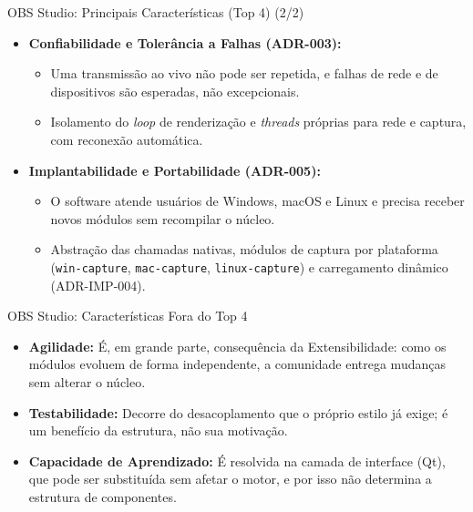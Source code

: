 \documentclass[aspectratio=169]{beamer}
\begin{document}
\begin{frame}{OBS Studio: Principais Características (Top 4) (2/2)}
\begin{itemize}\setlength{\itemsep}{0.8em}
\item \textbf{Confiabilidade e Tolerância a Falhas (ADR-003):}
  \begin{itemize}
  \item Uma transmissão ao vivo não pode ser repetida, e falhas de rede e de dispositivos são esperadas, não excepcionais.
  \item Isolamento do \textit{loop} de renderização e \textit{threads} próprias para rede e captura, com reconexão automática.
  \end{itemize}
\item \textbf{Implantabilidade e Portabilidade (ADR-005):}
  \begin{itemize}
  \item O software atende usuários de Windows, macOS e Linux e precisa receber novos módulos sem recompilar o núcleo.
  \item Abstração das chamadas nativas, módulos de captura por plataforma (\texttt{win-capture}, \texttt{mac-capture}, \texttt{linux-capture}) e carregamento dinâmico (ADR-IMP-004).
  \end{itemize}
\end{itemize}
\end{frame}

\begin{frame}{OBS Studio: Características Fora do Top 4}
\begin{itemize}\setlength{\itemsep}{0.8em}
\item \textbf{Agilidade:} É, em grande parte, consequência da Extensibilidade: como os módulos evoluem de forma independente, a comunidade entrega mudanças sem alterar o núcleo.
\item \textbf{Testabilidade:} Decorre do desacoplamento que o próprio estilo já exige; é um benefício da estrutura, não sua motivação.
\item \textbf{Capacidade de Aprendizado:} É resolvida na camada de interface (Qt), que pode ser substituída sem afetar o motor, e por isso não determina a estrutura de componentes.
\end{itemize}
\end{frame}
\end{document}

